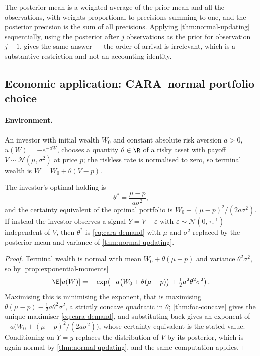 The posterior mean is a weighted average of the prior mean and all the
observations, with weights proportional to precisions summing to one, and the
posterior precision is the sum of all precisions. Applying
\autoref{thm:normal-updating} sequentially, using the posterior after $j$
observations as the prior for observation $j+1$, gives the same answer --- the
order of arrival is irrelevant, which is a substantive restriction and not an
accounting identity.

\subsection{Economic application: CARA--normal portfolio choice}
\label{subsec:prob-cara}

\paragraph{Environment.} An investor with initial wealth $W_0$ and constant
absolute risk aversion $a>0$, $u(W)=-e^{-aW}$, chooses a quantity $\theta\in\R$
of a risky asset with payoff $V\sim\mathcal{N}(\mu,\sigma^{2})$ at price $p$; the
riskless rate is normalised to zero, so terminal wealth is
$W=W_0+\theta(V-p)$.

\begin{proposition}\label{prop:cara-demand}
	The investor's optimal holding is
	\begin{equation}\label{eq:cara-demand}
		\theta^{\ast}=\frac{\mu-p}{a\sigma^{2}},
	\end{equation}
	and the certainty equivalent of the optimal portfolio is
	$W_0+(\mu-p)^{2}/(2a\sigma^{2})$. If instead the investor observes a signal
	$Y=V+\varepsilon$ with $\varepsilon\sim\mathcal{N}(0,\tau_\varepsilon^{-1})$
	independent of $V$, then $\theta^{\ast}$ is \eqref{eq:cara-demand} with $\mu$
	and $\sigma^{2}$ replaced by the posterior mean and variance of
	\autoref{thm:normal-updating}.
\end{proposition}

\begin{proof}
	Terminal wealth is normal with mean $W_0+\theta(\mu-p)$ and variance
	$\theta^{2}\sigma^{2}$, so by \autoref{prop:exponential-moments}
	\[
		\E[u(W)]=-\exp\!\left(-a\bigl(W_0+\theta(\mu-p)\bigr)
		+\tfrac12a^{2}\theta^{2}\sigma^{2}\right).
	\]
	Maximising this is minimising the exponent, that is maximising
	$\theta(\mu-p)-\tfrac12a\theta^{2}\sigma^{2}$, a strictly concave quadratic in
	$\theta$; \autoref{thm:foc-concave} gives the unique maximiser
	\eqref{eq:cara-demand}, and substituting back gives an exponent of
	$-a\bigl(W_0+(\mu-p)^{2}/(2a\sigma^{2})\bigr)$, whose certainty equivalent is
	the stated value. Conditioning on $Y=y$ replaces the distribution of $V$ by its
	posterior, which is again normal by \autoref{thm:normal-updating}, and the same
	computation applies.
\end{proof}

